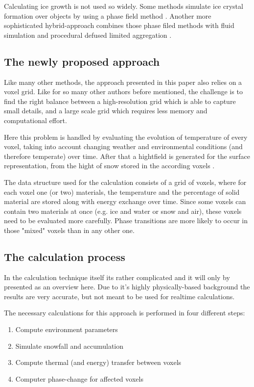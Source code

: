 Calculating ice growth is not used so widely. Some methods simulate ice crystal formation over objects by using a phase field method \cite{kim2003visual}. Another more sophisticated hybrid-approach combines those phase filed methods with fluid simulation and procedural defused limited aggregation \cite{kim2004hybrid}.

\subsection{The newly proposed approach}
Like many other methods, the approach presented in this paper \cite{benes2001layered} also relies on a voxel grid. Like for so many other authors before mentioned, the challenge is to find the right balance between a high-resolution grid which is able to capture small details, and a large scale grid which requires less memory and computational effort.

Here this problem is handled by evaluating the evolution of temperature of every voxel, taking into account changing weather and environmental conditions (and therefore temperate) over time. After that a hightfield is generated for the surface representation, from the hight of snow stored in the according voxels \cite{benes2001layered}.

The data structure used for the calculation consists of a grid of voxels, where for each voxel one (or two) materials, the temperature and the percentage of solid material are stored along with energy exchange over time. Since some voxels can contain two materials at once (e.g. ice and water or snow and air), these voxels need to be evaluated more carefully. Phase transitions are more likely to occur in those "mixed" voxels than in any other one.

\subsection{The calculation process}
In the calculation technique itself its rather complicated and it will only by presented as an overview here. Due to it's highly physically-based background the results are very accurate, but not meant to be used for realtime calculations.

The necessary calculations for this approach is performed in four different steps:
\begin{enumerate}
	\item Compute environment parameters
	\item Simulate snowfall and accumulation
	\item Compute thermal (and energy) transfer between voxels
	\item Computer phase-change for affected voxels
\end{enumerate}

